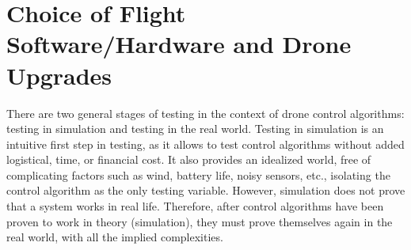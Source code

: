 \section{Choice of Flight Software/Hardware and Drone Upgrades}
\label{section:choice_of_flight_software}

There are two general stages of testing in the context of drone control algorithms:
testing in simulation and testing in the real world.
Testing in simulation is an intuitive first step in testing,
as it allows to test control algorithms without added logistical, time, or financial cost.
It also provides an idealized world, free of complicating factors such as wind, battery life, noisy sensors, etc.,
isolating the control algorithm as the only testing variable.
However, simulation does not prove that a system works in real life.
Therefore, after control algorithms have been proven to work in theory (simulation),
they must prove themselves again in the real world, with all the implied complexities.


